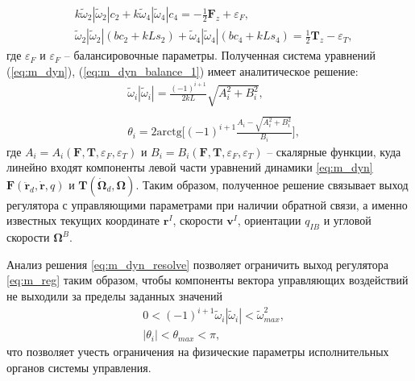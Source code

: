 \begin{equation} \label{eq:m_dyn_balance_2}
\begin{aligned}
&k \tilde\omega_2 |\tilde\omega_2| c_2 + k \tilde\omega_4 |\tilde\omega_4| c_4 =
-\frac{1}{2} \bm F_z + \varepsilon_F,
\\
&\tilde\omega_2 |\tilde\omega_2| (bc_2 + kLs_2)
+ \tilde\omega_4 |\tilde\omega_4| (bc_4 + kLs_4) =
\frac{1}{2} \bm T_z - \varepsilon_T,
\end{aligned}
\end{equation}
где $\varepsilon_F$ и $\varepsilon_F$ -- балансировочные параметры.
Полученная система уравнений (\ref{eq:m_dyn}), (\ref{eq:m_dyn_balance_1}) имеет аналитическое решение:
\begin{equation} \label{eq:m_dyn_resolve}
\begin{aligned}
&\tilde\omega_i |\tilde\omega_i| =
\frac{(-1)^{i+1}}{2kL}\sqrt{
	A^2_i + 
	B^2_i
},
\\
\phantom{}
\\
&\theta_i = 
2 \text{arctg} \Bigg[(-1)^{i+1}	
\frac{A_i -
	\sqrt{
		A^2_i + 
		B^2_i
}}
{B_i}
\Bigg],
\end{aligned}
\end{equation}
где $A_i = A_i(\bm F, \bm T, \varepsilon_F, \varepsilon_T)$
и
$B_i = B_i(\bm F, \bm T, \varepsilon_F, \varepsilon_T)$
-- скалярные функции, куда линейно входят компоненты левой части уравнений динамики \eqref{eq:m_dyn}
$\bm F(\ddot{\bm r}_d, \dot{\bm r}, q)$
и
$\bm T(\dot{\bm \Omega}_d, \bm\Omega)$.
Таким образом, полученное решение связывает выход регулятора с управляющими параметрами при наличии обратной связи, а именно известных текущих координате $\bm r^I$, скорости $\bm v^I$, ориентации $q_{IB}$ и угловой скорости $\bm \Omega^B$.

Анализ решения \eqref{eq:m_dyn_resolve} позволяет ограничить выход регулятора \eqref{eq:m_reg} таким образом, чтобы компоненты вектора управляющих воздействий не выходили за пределы заданных значений 
\begin{equation} \label{eq:m_limits_init}
\begin{aligned}
&0< (-1)^{i+1} \tilde \omega_i |\tilde\omega_i| < \tilde \omega_{max}^2,
\\
&|\theta_i| < \theta_{max} < \pi,
\end{aligned}
\end{equation}
что позволяет учесть ограничения на физические параметры исполнительных органов системы управления.

